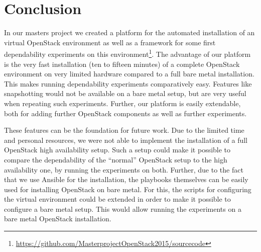\documentclass[conference]{IEEEtran}
\begin{document}
\section{Conclusion}
\label{conclusion}

In our masters project we created a platform for the automated installation of an virtual OpenStack environment as well as a framework for some first dependability experiments on this environment\footnote{\url{https://github.com/MasterprojectOpenStack2015/sourcecode}}. The advantage of our platform is the very fast installation (ten to fifteen minutes) of a complete OpenStack environment on very limited hardware compared to a full bare metal installation. This makes running dependability experiments comparatively easy. Features like snapshotting would not be available on a bare metal setup, but are very useful when repeating such experiments. Further, our platform is easily extendable, both for adding further OpenStack components as well as further experiments.

These features can be the foundation for future work. Due to the limited time and personal resources, we were not able to implement the installation of a full OpenStack high availability setup. Such a setup could make it possible to compare the dependability of the ``normal'' OpenStack setup to the high availability one, by running the experiments on both. Further, due to the fact that we use Ansible for the installation, the playbooks themselves can be easily used for installing OpenStack on bare metal. For this, the scripts for configuring the virtual environment could be extended in order to make it possible to configure a bare metal setup. This would allow running the experiments on a bare metal OpenStack installation.












\end{document}
